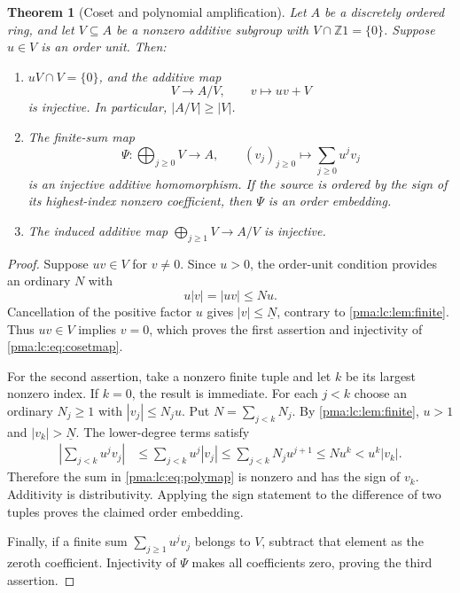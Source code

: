 \documentclass[11pt]{article}
\numberwithin{equation}{section}
\newtheorem{theorem}{Theorem}[section]
\theoremstyle{definition}
\theoremstyle{remark}
\newcommand{\Z}{\mathbb Z}
\newcommand{\std}[1]{\underline{#1}}
\begin{document}
\begin{theorem}[Coset and polynomial amplification]\label{pma:lc:thm:amplification}
Let $A$ be a discretely ordered ring, and let $V\subseteq A$ be a nonzero
additive subgroup with $V\cap\Z1=\{0\}$. Suppose $u\in V$ is an order
unit. Then:
\begin{enumerate}
\item $uV\cap V=\{0\}$, and the additive map
\begin{equation}\label{pma:lc:eq:cosetmap}
 V\longrightarrow A/V,\qquad v\longmapsto uv+V
\end{equation}
is injective. In particular, $|A/V|\ge|V|$.
\item The finite-sum map
\begin{equation}\label{pma:lc:eq:polymap}
 \Psi:\bigoplus_{j\ge0} V\longrightarrow A,
 \qquad (v_j)_{j\ge0}\longmapsto\sum_{j\ge0}u^jv_j
\end{equation}
is an injective additive homomorphism. If the source is ordered by the
sign of its \emph{highest-index nonzero coefficient}, then $\Psi$ is an
order embedding.
\item The induced additive map $\bigoplus_{j\ge1}V\to A/V$ is injective.
\end{enumerate}
\end{theorem}
\begin{proof}
Suppose $uv\in V$ for $v\ne0$. Since $u>0$, the order-unit condition
provides an ordinary $N$ with
\[
 u|v|=|uv|\le Nu.
\]
Cancellation of the positive factor $u$ gives $|v|\le\std N$, contrary
to \cref{pma:lc:lem:finite}. Thus $uv\in V$ implies $v=0$, which proves the
first assertion and injectivity of \eqref{pma:lc:eq:cosetmap}.

For the second assertion, take a nonzero finite tuple and let $k$ be its
largest nonzero index. If $k=0$, the result is immediate. For each $j<k$
choose an ordinary $N_j\ge1$ with $|v_j|\le N_ju$. Put
$N=\sum_{j<k}N_j$. By \cref{pma:lc:lem:finite}, $u>1$ and $|v_k|>\std N$.
The lower-degree terms satisfy
\begin{align}
 \left|\sum_{j<k}u^jv_j\right|
 &\le\sum_{j<k}u^j|v_j|
 \le\sum_{j<k}N_j u^{j+1}
 \le N u^k
 < u^k|v_k|. \label{pma:lc:eq:domination}
\end{align}
Therefore the sum in \eqref{pma:lc:eq:polymap} is nonzero and has the sign of
$v_k$. Additivity is distributivity. Applying the sign statement to the
difference of two tuples proves the claimed order embedding.

Finally, if a finite sum $\sum_{j\ge1}u^jv_j$ belongs to $V$, subtract
that element as the zeroth coefficient. Injectivity of $\Psi$ makes all
coefficients zero, proving the third assertion.
\end{proof}
\end{document}
